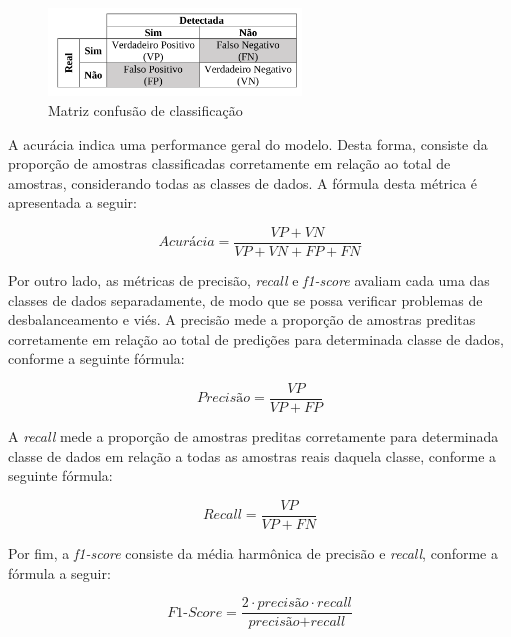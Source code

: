 \begin{figure}[h]
  \centering
  \caption{Matriz confusão de classificação}
   \label{fig:classificacao_positivo_negativo}
   \includegraphics[width=0.6\textwidth]{figuras/fig_13.png}
\end{figure}

A acurácia indica uma performance geral do modelo. Desta forma, consiste da proporção de amostras classificadas corretamente em relação ao total de amostras, considerando todas as classes de dados. A fórmula desta métrica é apresentada a seguir:

\begin{equation}
  \textit{Acurácia} = \frac{VP + VN}{VP + VN + FP + FN}
\end{equation}

Por outro lado, as métricas de precisão, \textit{recall} e \textit{f1-score} avaliam cada uma das classes de dados separadamente, de modo que se possa verificar problemas de desbalanceamento e viés. A precisão mede a proporção de amostras preditas corretamente em relação ao total de predições para determinada classe de dados, conforme a seguinte fórmula:

\begin{equation}
  \textit{Precisão} = \frac{VP}{VP + FP}
\end{equation}

A \textit{recall} mede a proporção de amostras preditas corretamente para determinada classe de dados em relação a todas as amostras reais daquela classe, conforme a seguinte fórmula:

\begin{equation}
  \textit{Recall} = \frac{VP}{VP + FN}
\end{equation}

Por fim, a \textit{f1-score} consiste da média harmônica de precisão e \textit{recall}, conforme a fórmula a seguir:

\begin{equation}
  \textit{F1-Score} = \frac{2 \cdot \textit{precisão} \cdot \textit{recall}}{\textit{precisão} + \textit{recall}}
\end{equation}
